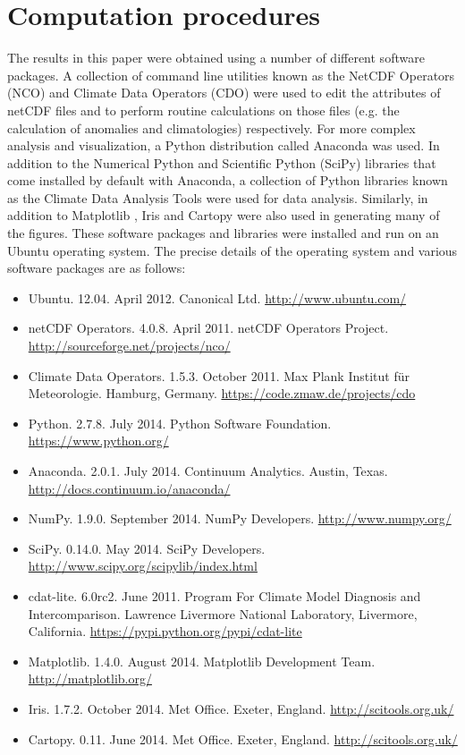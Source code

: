 \section{Computation procedures}\label{s:computation}

The results in this paper were obtained using a number of different software packages. A collection of command line utilities known as the NetCDF Operators (NCO) and Climate Data Operators (CDO) were used to edit the attributes of netCDF files and to perform routine calculations on those files (e.g. the calculation of anomalies and climatologies) respectively. For more complex analysis and visualization, a Python distribution called Anaconda was used. In addition to the Numerical Python \citep[NumPy;][]{VanDerWalt2011} and Scientific Python (SciPy) libraries that come installed by default with Anaconda, a collection of Python libraries known as the Climate Data Analysis Tools \citep[CDAT;][]{Doutriaux2009} were used for data analysis. Similarly, in addition to Matplotlib \citep[the default Python plotting library;][]{Hunter2007}, Iris and Cartopy were also used in generating many of the figures. These software packages and libraries were installed and run on an Ubuntu operating system. The precise details of the operating system and various software packages are as follows:
\begin{itemize}
\item Ubuntu. 12.04. April 2012. Canonical Ltd. \url{http://www.ubuntu.com/}
\item netCDF Operators. 4.0.8. April 2011. netCDF Operators Project. \url{http://sourceforge.net/projects/nco/}
\item Climate Data Operators. 1.5.3. October 2011. Max Plank Institut f{\"u}r Meteorologie. Hamburg, Germany. \url{https://code.zmaw.de/projects/cdo}
\item Python. 2.7.8. July 2014. Python Software Foundation. \url{https://www.python.org/}
\item Anaconda. 2.0.1. July 2014. Continuum Analytics. Austin, Texas. \url{http://docs.continuum.io/anaconda/}
\item NumPy. 1.9.0. September 2014. NumPy Developers. \url{http://www.numpy.org/}
\item SciPy. 0.14.0. May 2014. SciPy Developers. \url{http://www.scipy.org/scipylib/index.html}
\item cdat-lite. 6.0rc2. June 2011. Program For Climate Model Diagnosis and Intercomparison. Lawrence Livermore National Laboratory, Livermore, California. \url{https://pypi.python.org/pypi/cdat-lite}
\item Matplotlib. 1.4.0. August 2014. Matplotlib Development Team. \url{http://matplotlib.org/}
\item Iris. 1.7.2. October 2014. Met Office. Exeter, England. \url{http://scitools.org.uk/}
\item Cartopy. 0.11. June 2014. Met Office. Exeter, England. \url{http://scitools.org.uk/}
\end{itemize}

